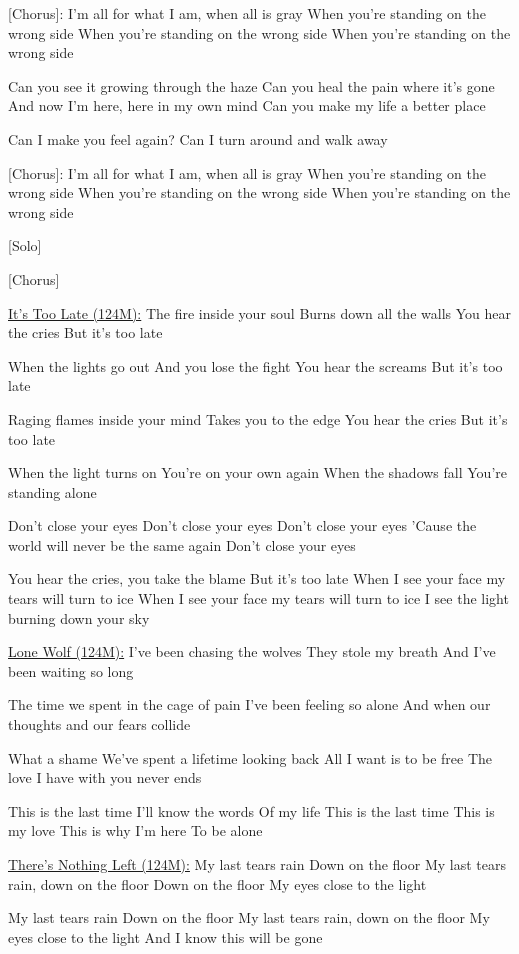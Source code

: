 \documentclass[11pt]{article}
\begin{document}
[Chorus]:
I'm all for what I am, when all is gray
When you're standing on the wrong side
When you're standing on the wrong side
When you're standing on the wrong side

Can you see it growing through the haze
Can you heal the pain where it's gone
And now I'm here, here in my own mind
Can you make my life a better place

Can I make you feel again?
Can I turn around and walk away

[Chorus]:
I'm all for what I am, when all is gray
When you're standing on the wrong side
When you're standing on the wrong side
When you're standing on the wrong side

[Solo]

[Chorus]

\underline{It’s Too Late (124M):}
The fire inside your soul
Burns down all the walls
You hear the cries
But it's too late

When the lights go out
And you lose the fight
You hear the screams
But it's too late

Raging flames inside your mind
Takes you to the edge
You hear the cries
But it's too late

When the light turns on
You're on your own again
When the shadows fall
You're standing alone

Don't close your eyes
Don't close your eyes
Don't close your eyes
'Cause the world will never be the same again
Don't close your eyes

You hear the cries, you take the blame
But it's too late
When I see your face my tears will turn to ice
When I see your face my tears will turn to ice
I see the light burning down your sky

\underline{Lone Wolf (124M):}
I've been chasing the wolves
They stole my breath
And I've been waiting so long

The time we spent in the cage of pain
I've been feeling so alone
And when our thoughts and our fears collide

What a shame
We've spent a lifetime looking back
All I want is to be free
The love I have with you never ends

This is the last time I'll know the words
Of my life
This is the last time
This is my love
This is why I'm here
To be alone

\underline{There’s Nothing Left (124M):}
My last tears rain
Down on the floor
My last tears rain, down on the floor
Down on the floor
My eyes close to the light

My last tears rain
Down on the floor
My last tears rain, down on the floor
My eyes close to the light
And I know this will be gone
\end{document}
